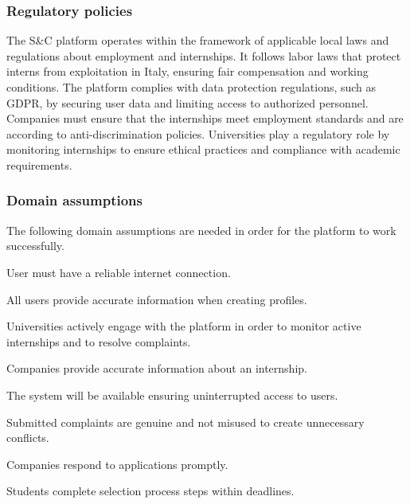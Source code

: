 \subsubsection{Regulatory policies}

The S\&C platform operates within the framework of applicable local laws and regulations about employment and internships. It follows labor laws that protect interns from exploitation in Italy, ensuring fair compensation and working conditions. The platform complies with data protection regulations, such as GDPR, by securing user data and limiting access to authorized personnel. Companies must ensure that the internships meet employment standards and are according to anti-discrimination policies. Universities play a regulatory role by monitoring internships to ensure ethical practices and compliance with academic requirements.

\subsubsection{Domain assumptions}

The following domain assumptions are needed in order for the platform to work successfully. 

\begin{enumerate}[label={\textbf{[D\arabic*]}}]
    \item User must have a reliable internet connection.
    \item All users provide accurate information when creating profiles.
    \item Universities actively engage with the platform in order to monitor active internships and to resolve complaints.
    \item Companies provide accurate information about an internship.
    \item The system will be available ensuring uninterrupted access to users.
    \item Submitted complaints are genuine and not misused to create unnecessary conflicts.
    \item Companies respond to applications promptly.
    \item Students complete selection process steps within deadlines.
\end{enumerate}